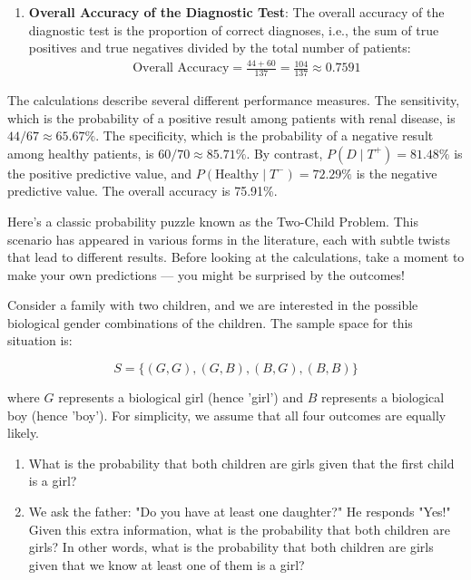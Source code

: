 \begin{solution}
\begin{enumerate}[label=(\alph*)]
        \item \textbf{Overall Accuracy of the Diagnostic Test}:
        The overall accuracy of the diagnostic test is the proportion of correct diagnoses, i.e., the sum of true positives and true negatives divided by the total number of patients:
        \begin{align*}
            \text{Overall Accuracy} =\frac{44+60}{137}=\frac{104}{137} \approx 0.7591
        \end{align*}
    \end{enumerate}


The calculations describe several different performance measures. The sensitivity, which is the probability of a positive result among patients with renal disease, is \(44/67\approx65.67\%\). The specificity, which is the probability of a negative result among healthy patients, is \(60/70\approx85.71\%\). By contrast, \(P(D\mid T^+)=81.48\%\) is the positive predictive value, and \(P(\text{Healthy}\mid T^-)=72.29\%\) is the negative predictive value. The overall accuracy is 75.91\%.
\end{solution}

Here’s a classic probability puzzle known as the Two-Child Problem. This scenario has appeared in various forms in the literature, each with subtle twists that lead to different results. Before looking at the calculations, take a moment to make your own predictions — you might be surprised by the outcomes!

\begin{example}
    Consider a family with two children, and we are interested in the possible biological gender combinations of the children. The sample space for this situation is:

\[
S = \{(G, G), (G, B), (B, G), (B, B)\}
\]

where \( G \) represents a biological girl (hence 'girl') and \( B \) represents a biological boy (hence 'boy'). For simplicity, we assume that all four outcomes are equally likely.

\begin{enumerate}[label=(\alph*)]
    \item What is the probability that both children are girls given that the first child is a girl?
    \item We ask the father: "Do you have at least one daughter?" He responds "Yes!" Given this extra information, what is the probability that both children are girls? In other words, what is the probability that both children are girls given that we know at least one of them is a girl?
\end{enumerate}
\end{example}

